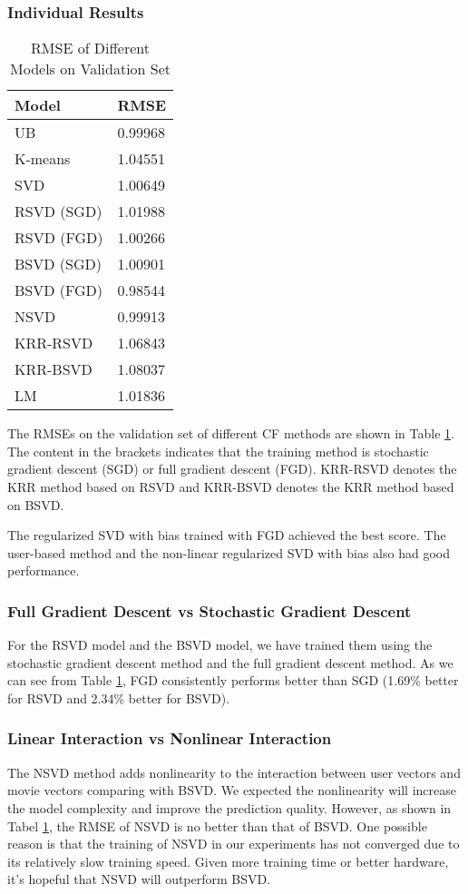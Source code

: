 \documentclass[10pt,conference,compsocconf]{IEEEtran}
\begin{document}
\subsubsection{Individual Results}
\begin{table}[htbp]
  \centering
  \begin{tabular}[c]{|l||l|}
    \hline
    Model&RMSE\\
    \hline
    UB&0.99968\\
    K-means&1.04551\\
    SVD&1.00649\\
    RSVD (SGD)&1.01988\\
    RSVD (FGD)&1.00266\\
    BSVD (SGD)&1.00901\\
    BSVD (FGD)&0.98544\\
    NSVD&0.99913\\
    KRR-RSVD&1.06843\\
    KRR-BSVD&1.08037\\
    LM&1.01836\\
    \hline
  \end{tabular}
    \caption{  \label{mytable} RMSE of Different Models on Validation Set}
\end{table}

The RMSEs on the validation set of different CF methods are shown in Table \ref{mytable}. The content in the brackets indicates that the training method is stochastic gradient descent (SGD) or full gradient descent (FGD). KRR-RSVD denotes the KRR method based on RSVD and KRR-BSVD denotes the KRR method based on BSVD.

The regularized SVD with bias trained with FGD achieved the best score. The user-based method and the non-linear regularized SVD with bias also had good performance.

\subsubsection{Full Gradient Descent vs Stochastic Gradient Descent}
For the RSVD model and the BSVD model, we have trained them using the stochastic gradient descent method and the full gradient descent method. As we can see from Table \ref{mytable}, FGD consistently performs better than SGD (1.69\% better for RSVD and 2.34\% better for BSVD).

\subsubsection{Linear Interaction vs Nonlinear Interaction}
The NSVD method adds nonlinearity to the interaction between user vectors and movie vectors comparing with BSVD. We expected the nonlinearity will increase the model complexity and improve the prediction quality. However, as shown in Tabel \ref{mytable}, the RMSE of NSVD is no better than that of BSVD. One possible reason is that the training of NSVD in our experiments has not converged due to its relatively slow training speed. Given more training time or better hardware, it's hopeful that NSVD will outperform BSVD.
\end{document}
